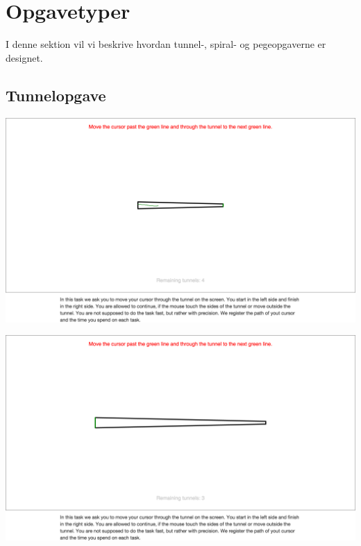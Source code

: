 \section*{Opgavetyper}
I denne sektion vil vi beskrive hvordan tunnel-, spiral- og pegeopgaverne er designet.

\subsection*{Tunnelopgave}
\begin{minipage}{\textwidth}
	\begin{minipage}{.5\textwidth}
		\centering
		\includegraphics[width=\textwidth, trim = .5cm 20cm .5cm 15cm, clip]{images/screenshots/ex_step_4_tunnel_path}
		\label{fig:ex_tunnel_1}
	\end{minipage}
	\begin{minipage}{.5\textwidth}
		\centering
		\includegraphics[width=\textwidth, trim = .5cm 20cm .5cm 15cm, clip]{images/screenshots/ex_step_4_tunnel_2}

\end{minipage}
\end{minipage}
